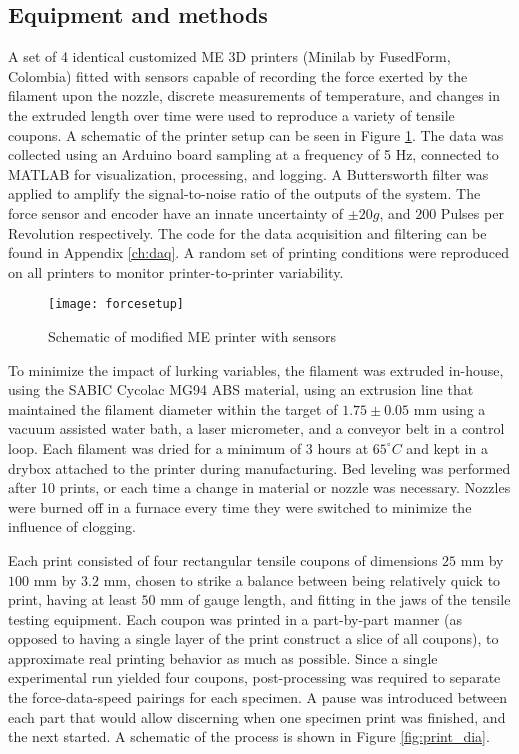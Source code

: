 \documentclass[main.tex]{subfiles}
\begin{document}
\subsection{Equipment and methods}\label{ssec:datag}

A set of 4 identical customized ME 3D printers (Minilab by FusedForm, Colombia) fitted with sensors capable of recording the force exerted by the filament upon the nozzle, discrete measurements of temperature, and changes in the extruded length over time were used to reproduce a variety of tensile coupons. A schematic of the printer setup can be seen in Figure \ref{fig:print_setup}. The data was collected using an Arduino board sampling at a frequency of 5 Hz, connected to MATLAB for visualization, processing, and logging. A Buttersworth filter was applied to amplify the signal-to-noise ratio of the outputs of the system. The force sensor and encoder have an innate uncertainty of $\pm20 g$, and $200$ Pulses per Revolution respectively. The code for the data acquisition and filtering can be found in Appendix \ref{ch:daq}. A random set of printing conditions were reproduced on all printers to monitor printer-to-printer variability.

\begin{figure}[!htbp]
	\center
	\texttt{[image: forcesetup]}
	\caption{Schematic of modified ME printer with sensors} \label{fig:print_setup}
\end{figure} 

To minimize the impact of lurking variables, the filament was extruded in-house, using the SABIC Cycolac MG94 ABS material, using an extrusion line that maintained the filament diameter within the target of $1.75 \pm 0.05 \text{ mm}$ using a vacuum assisted water bath, a laser micrometer, and a conveyor belt in a control loop. Each filament was dried for a minimum of 3 hours at $65^{\circ}C$ and kept in a drybox attached to the printer during manufacturing. Bed leveling was performed after 10 prints, or each time a change in material or nozzle was necessary. Nozzles were burned off in a furnace every time they were switched to minimize the influence of clogging.

Each print consisted of four rectangular tensile coupons of dimensions $25 \text{ mm}$ by $100 \text{ mm}$ by $3.2 \text{ mm}$, chosen to strike a balance between being relatively quick to print, having at least $50\text{ mm}$ of gauge length, and fitting in the jaws of the tensile testing equipment. Each coupon was printed in a part-by-part manner (as opposed to having a single layer of the print construct a slice of all coupons), to approximate real printing behavior as much as possible. Since a single experimental run yielded four coupons, post-processing was required to separate the force-data-speed pairings for each specimen. A pause was introduced between each part that would allow discerning when one specimen print was finished, and the next started. A schematic of the process is shown in Figure \ref{fig:print_dia}. 
\end{document}

